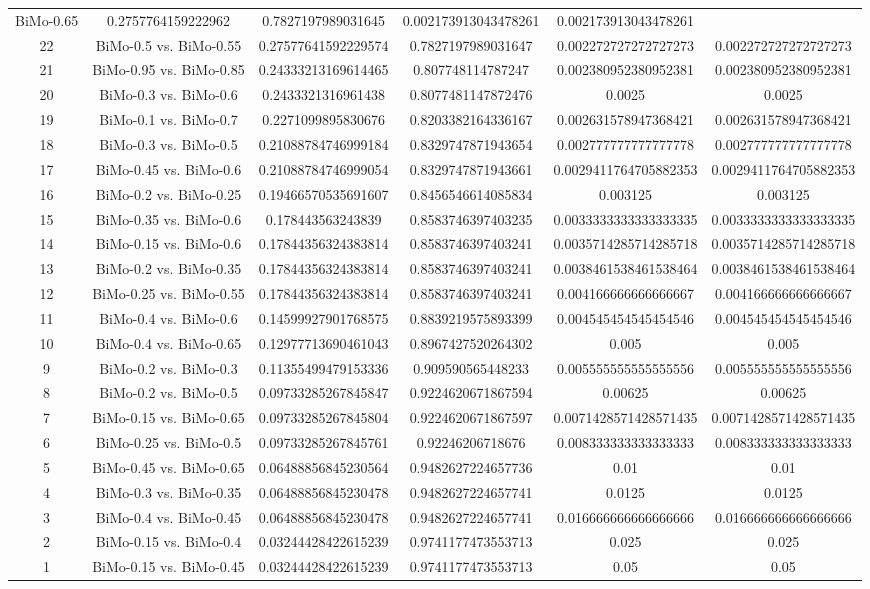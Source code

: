 \documentclass[a4paper,10pt]{article}
\begin{document}
\begin{landscape}
\begin{table}[!htp]
\begin{tabular}{cccccc}
BiMo-0.65&0.2757764159222962&0.7827197989031645&0.002173913043478261&0.002173913043478261\\22&BiMo-0.5 vs. BiMo-0.55&0.27577641592229574&0.7827197989031647&0.002272727272727273&0.002272727272727273\\21&BiMo-0.95 vs. BiMo-0.85&0.24333213169614465&0.807748114787247&0.002380952380952381&0.002380952380952381\\20&BiMo-0.3 vs. BiMo-0.6&0.2433321316961438&0.8077481147872476&0.0025&0.0025\\19&BiMo-0.1 vs. BiMo-0.7&0.2271099895830676&0.8203382164336167&0.002631578947368421&0.002631578947368421\\18&BiMo-0.3 vs. BiMo-0.5&0.21088784746999184&0.8329747871943654&0.002777777777777778&0.002777777777777778\\17&BiMo-0.45 vs. BiMo-0.6&0.21088784746999054&0.8329747871943661&0.0029411764705882353&0.0029411764705882353\\16&BiMo-0.2 vs. BiMo-0.25&0.19466570535691607&0.8456546614085834&0.003125&0.003125\\15&BiMo-0.35 vs. BiMo-0.6&0.178443563243839&0.8583746397403235&0.0033333333333333335&0.0033333333333333335\\14&BiMo-0.15 vs. BiMo-0.6&0.17844356324383814&0.8583746397403241&0.0035714285714285718&0.0035714285714285718\\13&BiMo-0.2 vs. BiMo-0.35&0.17844356324383814&0.8583746397403241&0.0038461538461538464&0.0038461538461538464\\12&BiMo-0.25 vs. BiMo-0.55&0.17844356324383814&0.8583746397403241&0.004166666666666667&0.004166666666666667\\11&BiMo-0.4 vs. BiMo-0.6&0.14599927901768575&0.8839219575893399&0.004545454545454546&0.004545454545454546\\10&BiMo-0.4 vs. BiMo-0.65&0.12977713690461043&0.8967427520264302&0.005&0.005\\9&BiMo-0.2 vs. BiMo-0.3&0.11355499479153336&0.909590565448233&0.005555555555555556&0.005555555555555556\\8&BiMo-0.2 vs. BiMo-0.5&0.09733285267845847&0.9224620671867594&0.00625&0.00625\\7&BiMo-0.15 vs. BiMo-0.65&0.09733285267845804&0.9224620671867597&0.0071428571428571435&0.0071428571428571435\\6&BiMo-0.25 vs. BiMo-0.5&0.09733285267845761&0.92246206718676&0.008333333333333333&0.008333333333333333\\5&BiMo-0.45 vs. BiMo-0.65&0.06488856845230564&0.9482627224657736&0.01&0.01\\4&BiMo-0.3 vs. BiMo-0.35&0.06488856845230478&0.9482627224657741&0.0125&0.0125\\3&BiMo-0.4 vs. BiMo-0.45&0.06488856845230478&0.9482627224657741&0.016666666666666666&0.016666666666666666\\2&BiMo-0.15 vs. BiMo-0.4&0.03244428422615239&0.9741177473553713&0.025&0.025\\1&BiMo-0.15 vs. BiMo-0.45&0.03244428422615239&0.9741177473553713&0.05&0.05\\\hline

\end{tabular}
\end{table}
\end{landscape}
\end{document}
